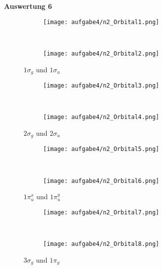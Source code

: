\documentclass[12pt]{article}
\begin{document}
\begin{onehalfspace}
\textbf{Auswertung 6}
\begin{figure}[!hptb]
    \centering
    \begin{subfigure}[b]{0.4\textwidth}
        \texttt{[image: aufgabe4/n2\_Orbital1.png]}
    \end{subfigure}
    ~ %
    \begin{subfigure}[b]{0.4\textwidth}
        \texttt{[image: aufgabe4/n2\_Orbital2.png]}
    \end{subfigure}
    \caption{$1 \sigma _g$  und $1 \sigma _u$ }
\end{figure}

\begin{figure}[!hptb]
    \centering
    \begin{subfigure}[b]{0.4\textwidth}
        \texttt{[image: aufgabe4/n2\_Orbital3.png]}
    \end{subfigure}
    ~ %
    \begin{subfigure}[b]{0.4\textwidth}
        \texttt{[image: aufgabe4/n2\_Orbital4.png]}
    \end{subfigure}
    \caption{$2 \sigma _g$ und $2 \sigma _u$ }
\end{figure}

\begin{figure}[!hptb]
    \centering
    \begin{subfigure}[b]{0.4\textwidth}
        \texttt{[image: aufgabe4/n2\_Orbital5.png]}
    \end{subfigure}
    ~ %
    \begin{subfigure}[b]{0.4\textwidth}
        \texttt{[image: aufgabe4/n2\_Orbital6.png]}
    \end{subfigure}
		 \caption{$1 \pi _u^x$ und $1 \pi _u^y$ }
\end{figure}
\newpage
\begin{figure}[!hptb]
    \centering
    \begin{subfigure}[b]{0.4\textwidth}
        \texttt{[image: aufgabe4/n2\_Orbital7.png]}
    \end{subfigure}
    ~ %
    \begin{subfigure}[b]{0.4\textwidth}
        \texttt{[image: aufgabe4/n2\_Orbital8.png]}
    \end{subfigure}
       \caption{$3 \sigma _g$ und $1 \pi _g$}
\end{figure}


\end{onehalfspace}
\end{document}
